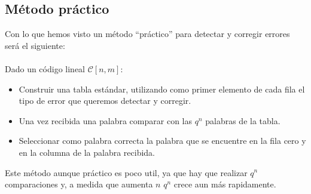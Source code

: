 \subsection{M\'etodo pr\'actico}

Con lo que hemos visto un m\'etodo ``pr\'actico'' para detectar y corregir
errores ser\'a el siguiente:\\ \\
%
Dado un c\'odigo lineal $\mathcal{C}[n,m]$:
\begin{itemize}
\item Construir una tabla est\'andar, utilizando como primer elemento de cada
fila el tipo de error que queremos detectar y corregir.
\item Una vez recibida una palabra comparar con las $q^n$ palabras de la tabla.
\item Seleccionar como palabra correcta la palabra que se encuentre en la fila
cero y en la columna de la palabra recibida.
\end{itemize}
Este m\'etodo aunque pr\'actico es poco util, ya que hay que realizar $q^n$
comparaciones y, a medida que aumenta $n$ $q^n$ crece aun m\'as rapidamente.
